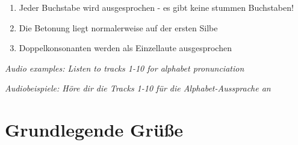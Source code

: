 \begin{grammar}
\begin{enumerate}
    \item Jeder Buchstabe wird ausgesprochen - es gibt keine stummen Buchstaben!
    \item Die Betonung liegt normalerweise auf der ersten Silbe
    \item Doppelkonsonanten werden als Einzellaute ausgesprochen
\end{enumerate}

\textit{Audio examples: Listen to tracks 1-10 for alphabet pronunciation}

\textit{Audiobeispiele: Höre dir die Tracks 1-10 für die Alphabet-Aussprache an}
\end{grammar}

\section{Grundlegende Grüße}


